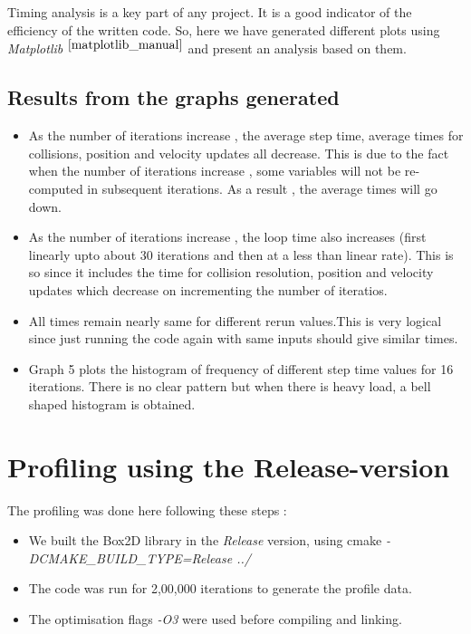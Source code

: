 \documentclass[a4paper,11pt]{article}
\begin{document}
Timing analysis is a key part of any project. It is a good indicator of the efficiency of the written code. So, here we have generated 
different plots using \emph{Matplotlib} $^{\cite{matplotlib_manual}}$ and present an analysis based on them.

\subsection{Results from the graphs generated}

\begin{itemize}
\item As the number of iterations increase , the average step time, average times for collisions, position and velocity updates all decrease. This is due to the fact when the number of iterations increase , some variables will not be re-computed in subsequent iterations.
As a result , the average times will go down.
\item As the number of iterations increase , the loop time also increases (first linearly upto about 30 iterations and then at a less than linear rate). This is so since it includes the time for collision resolution, position and velocity updates which decrease on incrementing the number of iteratios.
\item All times remain nearly same for different rerun values.This is very logical since just running the code again with same inputs should give similar times.
\item Graph 5 plots the histogram of frequency of different step time values for 16 iterations. There is no clear pattern but when there is heavy load, a bell shaped histogram is obtained.
\end{itemize}

\section{Profiling using the Release-version}

The profiling was done here following these steps :

\begin{itemize}

\item We built the Box2D library in the \emph{Release} version, using cmake \emph{-DCMAKE\_BUILD\_TYPE=Release ../}
\item The code was run for 2,00,000 iterations to generate the profile data. 
\item The optimisation flags \emph{-O3} were used before compiling and linking.

\end{itemize}
\end{document}
